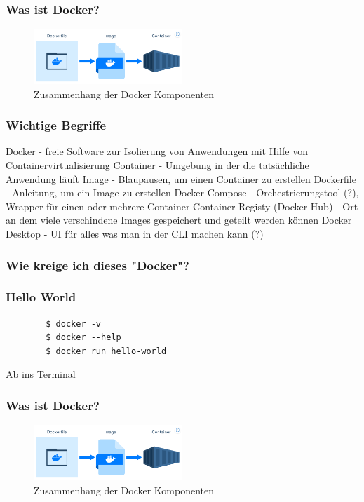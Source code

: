 \documentclass[22pt,handout]{beamer}
\begin{document}
\begin{frame}[t]
    \frametitle{Was ist Docker?}
    \begin{figure}[h]
        \centering
        \includegraphics[width=0.5\textwidth]{Bilder/Docker-Ablauf.png}
        \caption{Zusammenhang der Docker Komponenten}
    \end{figure}
\end{frame}

\begin{frame}[t]
    \frametitle{Wichtige Begriffe}
    Docker
    - freie Software zur Isolierung von Anwendungen mit Hilfe von Containervirtualisierung
    Container
    - Umgebung in der die tatsächliche Anwendung läuft
    Image
    - Blaupausen, um einen Container zu erstellen
    Dockerfile
    - Anleitung, um ein Image zu erstellen
    Docker Compose
    - Orchestrierungstool (?), Wrapper für einen oder mehrere Container
    Container Registy (Docker Hub) 
    - Ort an dem viele verschindene Images gespeichert und geteilt werden können
    Docker Desktop
    - UI für alles was man in der CLI machen kann (?) %
\end{frame}

\begin{frame}[t]
    \frametitle{Wie kreige ich dieses "Docker"?}
\end{frame}

\begin{frame}[fragile]
    \frametitle{Hello World} %
    \begin{verbatim}
        $ docker -v
        $ docker --help
        $ docker run hello-world
    \end{verbatim}

    Ab ins Terminal
\end{frame}

\begin{frame}[t]
    \frametitle{Was ist Docker?}
    \begin{figure}[h]
        \centering
        \includegraphics[width=0.5\textwidth]{Bilder/Docker-Ablauf.png}
        \caption{Zusammenhang der Docker Komponenten}
    \end{figure}
\end{frame}
\end{document}
